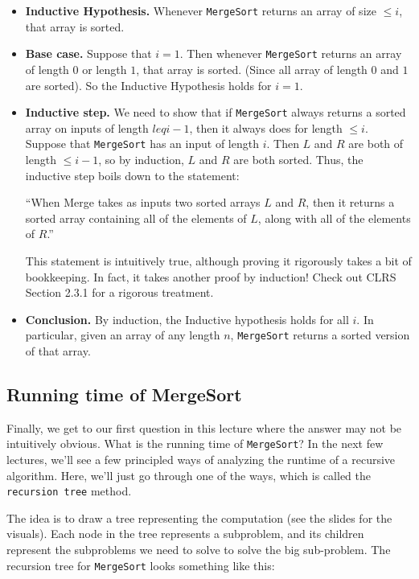 \documentclass [12pt]{article}
\begin{document}
\begin{itemize}
    \item \textbf{Inductive Hypothesis.} Whenever \texttt{MergeSort} returns an array of size $\leq i$, that array is sorted.
    \item \textbf{Base case.} Suppose that $i = 1$. Then whenever \texttt{MergeSort} returns an array of length $0$ or length $1$, that array is sorted. (Since all array of length $0$ and $1$ are sorted). So the Inductive Hypothesis holds for $i = 1$.
    \item \textbf{Inductive step.} We need to show that if \texttt{MergeSort} always returns a sorted array on inputs of length $leq i - 1$, then it always does for length $\leq i$. Suppose that \texttt{MergeSort} has an input of length $i$. Then $L$ and $R$ are both of length $\leq i - 1$, so by induction, $L$ and $R$ are both sorted. Thus, the inductive step boils down to the statement: 

    ``When Merge takes as inputs two sorted arrays $L$ and $R$, then it returns a sorted array containing all of the elements of $L$, along with all of the elements of $R$.''

    This statement is intuitively true, although proving it rigorously takes a bit of bookkeeping. In fact, it takes another proof by induction! Check out CLRS Section 2.3.1 for a rigorous treatment.
    \item \textbf{Conclusion.} By induction, the Inductive hypothesis holds for all $i$. In particular, given an array of any length $n$, \texttt{MergeSort} returns a sorted version of that array.
\end{itemize}

\subsection{Running time of MergeSort}
Finally, we get to our first question in this lecture where the answer may not be intuitively obvious. What is the running time of \texttt{MergeSort}? In the next few lectures, we'll see a few principled ways of analyzing the runtime of a recursive algorithm. Here, we'll just go through one of the ways, which is called the \texttt{recursion tree} method.

The idea is to draw a tree representing the computation (see the slides for the visuals). Each node in the tree represents a subproblem, and its children represent the subproblems we need to solve to solve the big sub-problem. The recursion tree for \texttt{MergeSort} looks something like
this:
\end{document}
